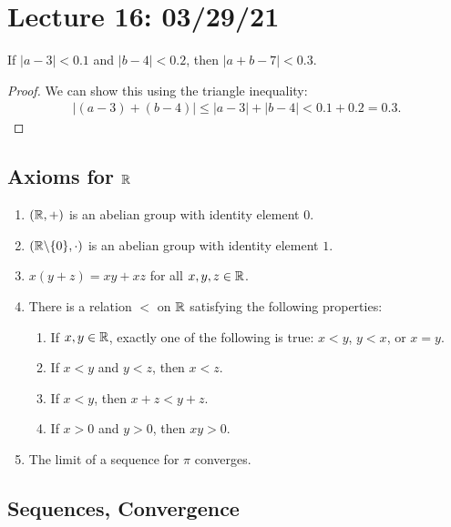 \section{Lecture 16: 03/29/21}

\begin{example}
If $|a - 3| < 0.1$ and $|b - 4| < 0.2$, then $|a + b - 7| < 0.3$.
\end{example}

\begin{proof}
We can show this using the triangle inequality:
\begin{align*}
    |(a - 3) + (b - 4)| \le |a - 3| + | b - 4| < 0.1 + 0.2 = 0.3.
\end{align*}
\end{proof}

\subsection{Axioms for $\mathbb{R}$}

\begin{definition} 
\quad
\begin{enumerate}
    \item $(\mathbb{R}, +)$ is an abelian group with identity element $0$.
    \item $(\mathbb{R} \backslash \{0\}, \cdot)$ is an abelian group with identity element $1$.
    \item $x(y + z) = xy + xz$ for all $x, y, z \in \mathbb{R}$.
    \item There is a relation $<$ on $\mathbb{R}$ satisfying the following properties:
    \begin{enumerate}
        \item If $x, y \in \mathbb{R}$, exactly one of the following is true: $x<y$, $y < x$, or $x = y$.
        \item If $x<y$ and $y < z$, then $x < z$.
        \item If $x < y$, then $x + z < y + z$.
        \item If $x > 0$ and $y > 0$, then $xy > 0$.
    \end{enumerate}
    \item The limit of a sequence for $\pi$ converges.
\end{enumerate}
\end{definition}

\subsection{Sequences, Convergence}

